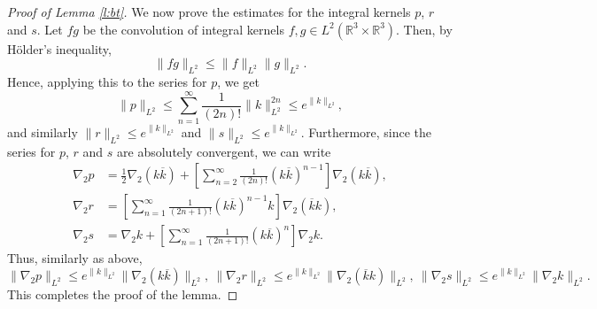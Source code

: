 \documentclass[11pt,a4paper,DIV11]{scrartcl}	%
\newcommand{\Rbb}{\mathbb{R}}		%
\begin{document}
\begin{proof}[Proof of Lemma \ref{l:bt}]
  We now prove the estimates for the integral kernels $p$, $r$ and $s$. 
  Let $fg$ be the convolution of integral kernels $f, g \in L^2(\Rbb^3\times\Rbb^3)$. Then, by H\"older's inequality,
  \[
    \| f g \|_{L^2} \le \| f \|_{L^2} \| g \|_{L^2}.
  \]
  Hence, applying this to the series for $p$, we get
  \[
    \| p \|_{L^2} \le \sum_{n=1}^\infty \frac{1}{(2n)!} \| k \|_{L^2}^{2n} \le
    e^{\| k \|_{L^2}},
  \]
  and similarly $\| r \|_{L^2} \le e^{\| k \|_{L^2}}$ and $\| s \|_{L^2} \le
  e^{\| k \|_{L^2}}$. Furthermore, since the series for $p$, $r$ and $s$ are
  absolutely convergent, we can write
  \begin{align*}
    \nabla_2 p & = \frac{1}{2} \nabla_2 (k \overline{k}) + \left[
    \sum_{n=2}^\infty \frac{1}{(2n)!} (k \overline{k})^{n-1} \right]
    \nabla_2 (k \overline{k}) , \\
    \nabla_2 r & = \left[ \sum_{n=1}^\infty \frac{1}{(2n+1)!} (k
    \overline{k})^{n-1} k \right] \nabla_2 (\overline{k} k), \\
    \nabla_2 s & = \nabla_2 k + \left[ \sum_{n=1}^\infty \frac{1}{(2n+1)!}
    (k \overline{k})^n \right] \nabla_2 k.
  \end{align*}
  Thus, similarly as above,
  \begin{displaymath}
    \| \nabla_2 p \|_{L^2} \le e^{\| k \|_{L^2}} \| \nabla_2 (k
    \overline{k}) \|_{L^2},\  
    \| \nabla_2 r \|_{L^2} \le e^{\| k \|_{L^2}} \| \nabla_2
    (\overline{k} k) \|_{L^2},\ 
    \| \nabla_2 s \|_{L^2} \le e^{\| k \|_{L^2}} \| \nabla_2 k
    \|_{L^2}.
  \end{displaymath}
This completes the proof of the lemma.
\end{proof}
\end{document}
